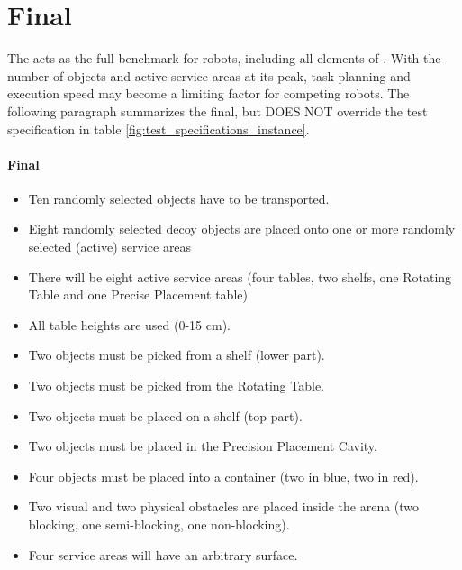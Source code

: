 \section{Final}
\label{sec:Final}

The  acts as the full benchmark for robots, including all elements of \RCAW.
With the number of objects and active service areas at its peak, task planning and execution speed may become a limiting factor for competing robots. The following paragraph summarizes the final, but DOES NOT override the test specification in table \ref{fig:test_specifications_instance}.

\paragraph{Final}
\begin{itemize}
\item Ten randomly selected objects have to be transported.
\item Eight randomly selected decoy objects are placed onto one or more randomly selected (active) service areas
\item There will be eight active service areas (four tables,  two shelfs, one Rotating Table and one Precise Placement table)
\item All table heights are used (0-15 $\si{\centi\meter}$).
\item Two objects must be picked from a shelf (lower part).
\item Two objects must be picked from the Rotating Table.
\item Two objects must be placed on a shelf (top part).
\item Two objects must be placed in the Precision Placement Cavity.
\item Four objects must be placed into a container (two in blue, two in red).
\item Two visual and two physical obstacles are placed inside the arena (two blocking, one semi-blocking, one non-blocking).
\item Four service areas will have an arbitrary surface.
\end{itemize}